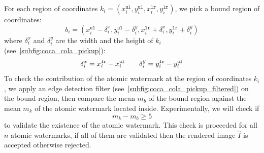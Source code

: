 For each region of coordinates $k_i = \left(x^{\mathtt{ul}}_i, y^{\mathtt{ul}}_{i},x^{\mathtt{lr}}_i, y^{\mathtt{lr}}_{i}\right)$, we pick a bound region of coordinates:
\begin{equation*}
    b_i =  \left(x^{\mathtt{ul}}_i - \delta^{x}_{i}, y^{\mathtt{ul}}_{i} - \delta^{y}_i ,x^{\mathtt{lr}}_i + \delta^{x}_{i}, y^{\mathtt{lr}}_{i} + \delta^{y}_{i}\right)
\end{equation*}
where $\delta^{x}_{i}$ and $\delta^{y}_{i}$ are the width and the height of $k_i$ (see~\autoref{subfig:coca_cola_pickup}):
\begin{equation*}
    \delta^{x}_{i} = x^{\mathtt{lr}}_i - x^{\mathtt{ul}}_i \qquad \delta^{y}_{i} = y^{\mathtt{lr}}_i - y^{\mathtt{ul}}_i \\
\end{equation*}
To check the contribution of the atomic watermark at the region of coordinates $k_i$, we apply an edge detection filter (see~\autoref{subfig:coca_cola_pickup_filtered}) on the bound region, then compare the mean $m_b$ of the bound region against the mean $m_k$ of the atomic watermark located inside. Experimentally, we will check if
\begin{equation}\label{eq:edge_difference}
    m_k - m_b \geq 5
\end{equation}
to validate the existence of the atomic watermark. This check is proceeded for all $n$ atomic watermarks, if all of them are validated then the rendered image $\hat{I}$ is accepted otherwise rejected.
